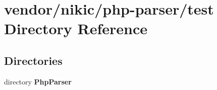 \section{vendor/nikic/php-\/parser/test Directory Reference}
\label{dir_909db172c3f4755297ce91adbe7aafb7}
\subsection*{Directories}
\begin{DoxyCompactItemize}
\item 
directory {\bf Php\+Parser}
\end{DoxyCompactItemize}
